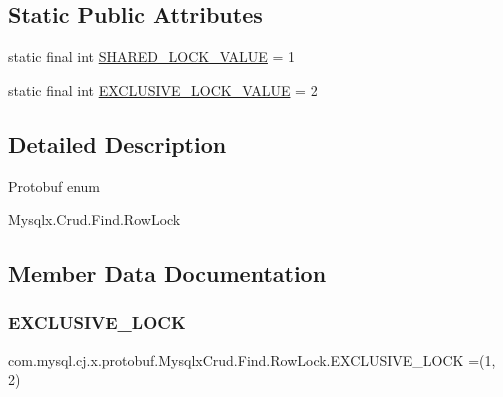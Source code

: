 \subsection*{Static Public Attributes}
\begin{DoxyCompactItemize}
\item 
static final int \mbox{\hyperlink{enumcom_1_1mysql_1_1cj_1_1x_1_1protobuf_1_1_mysqlx_crud_1_1_find_1_1_row_lock_a9b593ba176e2c6d30e800321555455ca}{S\+H\+A\+R\+E\+D\+\_\+\+L\+O\+C\+K\+\_\+\+V\+A\+L\+UE}} = 1
\item 
static final int \mbox{\hyperlink{enumcom_1_1mysql_1_1cj_1_1x_1_1protobuf_1_1_mysqlx_crud_1_1_find_1_1_row_lock_a907b6abaea0ec579d241d16f904254cb}{E\+X\+C\+L\+U\+S\+I\+V\+E\+\_\+\+L\+O\+C\+K\+\_\+\+V\+A\+L\+UE}} = 2
\end{DoxyCompactItemize}


\subsection{Detailed Description}
Protobuf enum
\begin{DoxyCode}
Mysqlx.Crud.Find.RowLock 
\end{DoxyCode}
 

\subsection{Member Data Documentation}
\mbox{\label{enumcom_1_1mysql_1_1cj_1_1x_1_1protobuf_1_1_mysqlx_crud_1_1_find_1_1_row_lock_ac7bfbc64e9102fffbaccd2c09fdff117}} 
\subsubsection{\texorpdfstring{E\+X\+C\+L\+U\+S\+I\+V\+E\+\_\+\+L\+O\+CK}{EXCLUSIVE\_LOCK}}
{\footnotesize\ttfamily com.\+mysql.\+cj.\+x.\+protobuf.\+Mysqlx\+Crud.\+Find.\+Row\+Lock.\+E\+X\+C\+L\+U\+S\+I\+V\+E\+\_\+\+L\+O\+CK =(1, 2)}

